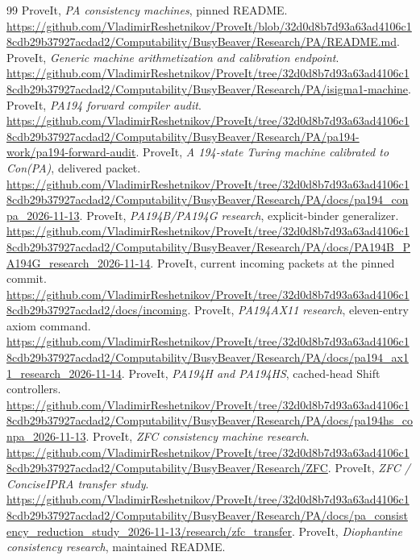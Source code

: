 \documentclass[11pt]{article}
\theoremstyle{definition}\newtheorem{definition}[theorem]{Definition}
\begin{document}


\begin{thebibliography}{99}
 ProveIt, \emph{PA consistency machines}, pinned README.
\url{https://github.com/VladimirReshetnikov/ProveIt/blob/32d0d8b7d93a63ad4106c18cdb29b37927acdad2/Computability/BusyBeaver/Research/PA/README.md}.
 ProveIt, \emph{Generic machine arithmetization and calibration endpoint}.
\url{https://github.com/VladimirReshetnikov/ProveIt/tree/32d0d8b7d93a63ad4106c18cdb29b37927acdad2/Computability/BusyBeaver/Research/PA/isigma1-machine}.
 ProveIt, \emph{PA194 forward compiler audit}.
\url{https://github.com/VladimirReshetnikov/ProveIt/tree/32d0d8b7d93a63ad4106c18cdb29b37927acdad2/Computability/BusyBeaver/Research/PA/pa194-work/pa194-forward-audit}.
 ProveIt, \emph{A 194-state Turing machine calibrated to Con(PA)}, delivered packet.
\url{https://github.com/VladimirReshetnikov/ProveIt/tree/32d0d8b7d93a63ad4106c18cdb29b37927acdad2/Computability/BusyBeaver/Research/PA/docs/pa194_conpa_2026-11-13}.
 ProveIt, \emph{PA194B/PA194G research}, explicit-binder generalizer.
\url{https://github.com/VladimirReshetnikov/ProveIt/tree/32d0d8b7d93a63ad4106c18cdb29b37927acdad2/Computability/BusyBeaver/Research/PA/docs/PA194B_PA194G_research_2026-11-14}.
 ProveIt, current incoming packets at the pinned commit.
\url{https://github.com/VladimirReshetnikov/ProveIt/tree/32d0d8b7d93a63ad4106c18cdb29b37927acdad2/docs/incoming}.
 ProveIt, \emph{PA194AX11 research}, eleven-entry axiom command.
\url{https://github.com/VladimirReshetnikov/ProveIt/tree/32d0d8b7d93a63ad4106c18cdb29b37927acdad2/Computability/BusyBeaver/Research/PA/docs/pa194_ax11_research_2026-11-14}.
 ProveIt, \emph{PA194H and PA194HS}, cached-head Shift controllers.
\url{https://github.com/VladimirReshetnikov/ProveIt/tree/32d0d8b7d93a63ad4106c18cdb29b37927acdad2/Computability/BusyBeaver/Research/PA/docs/pa194hs_conpa_2026-11-13}.
 ProveIt, \emph{ZFC consistency machine research}.
\url{https://github.com/VladimirReshetnikov/ProveIt/tree/32d0d8b7d93a63ad4106c18cdb29b37927acdad2/Computability/BusyBeaver/Research/ZFC}.
 ProveIt, \emph{ZFC / ConciseIPRA transfer study}.
\url{https://github.com/VladimirReshetnikov/ProveIt/tree/32d0d8b7d93a63ad4106c18cdb29b37927acdad2/Computability/BusyBeaver/Research/PA/docs/pa_consistency_reduction_study_2026-11-13/research/zfc_transfer}.
 ProveIt, \emph{Diophantine consistency research}, maintained README.

\end{thebibliography}
\end{document}
